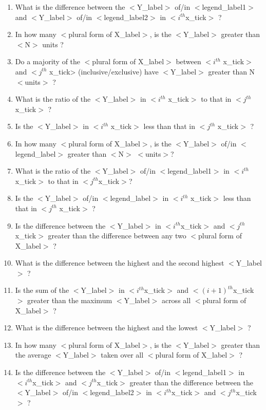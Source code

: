 \documentclass[10pt,twocolumn,letterpaper]{article}
\begin{document}
\begin{enumerate}
\begin{enumerate}[1.]
        \item What is the difference between the $<$Y\_label$>$ of/in $<$legend\_label1$>$ and $<$Y\_label$>$ of/in $<$legend\_label2$>$ in $<i^{th}$x\_tick$>$ ?
        \item In how many $<$plural form of X\_label$>$, is the $<$Y\_label$>$ greater than $<$N$>$ units ?
        \item Do a majority of the $<$plural form of X\_label$>$ between $<i^{th}$ x\_tick$>$ and $<j^{th}$ x\_tick> (inclusive/exclusive)  have $<$Y\_label$>$ greater than N $<$units$>$ ?
        \item What is the ratio of the $<$Y\_label$>$ in $<i^{th}$ x\_tick$>$ to that in $<j^{th}$ x\_tick$>$ ?
        \item Is the $<$Y\_label$>$ in $<i^{th}$ x\_tick$>$ less than that in $<j^{th}$ x\_tick$>$ ?
        \item In how many $<$plural form of X\_label$>$, is the $<$Y\_label$>$ of/in $<$legend\_label$>$ greater than $<$N$>$ $<$units$>$?
        \item What is the ratio of the $<$Y\_label$>$ of/in $<$legend\_label1$>$ in $<i^{th}$ x\_tick$>$ to that in $<j^{th}$x\_tick$>$?
        \item Is the $<$Y\_label$>$ of/in $<$legend\_label$>$ in  $<i^{th}$ x\_tick$>$ less than that in $<j^{th}$ x\_tick$>$ ?
        \item Is the difference between the $<$Y\_label$>$ in $<i^{th}$x\_tick$>$ and $<j^{th}$x\_tick$>$ greater than the difference between any two $<$plural form of X\_label$>$ ?
        \item What is the difference between the highest and the second highest $<$Y\_label$>$ ?
        \item Is the sum of the $<$Y\_label$>$ in $<i^{th}$x\_tick$>$ and $<(i+1)^{th}$x\_tick$>$ greater than the maximum $<$Y\_label$>$ across all $<$plural form of X\_label$>$ ?
        \item What is the difference between the highest and the lowest $<$Y\_label$>$ ?
        \item In how many $<$plural form of X\_label$>$, is the $<$Y\_label$>$ greater than the average $<$Y\_label$>$ taken over all $<$plural form of X\_label$>$ ?
        \item Is the difference between the $<$Y\_label$>$ of/in $<$legend\_label1$>$ in $<i^{th}$x\_tick$>$ and $<j^{th}$x\_tick$>$ greater than the difference between the $<$Y\_label$>$ of/in $<$legend\_label2$>$ in $<i^{th}$x\_tick$>$ and $<j^{th}$x\_tick$>$ ?

\end{enumerate}
\end{enumerate}
\end{document}
